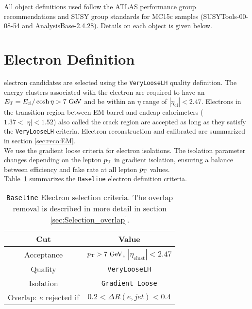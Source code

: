 \indent All object definitions used follow the ATLAS performance group recommendations and SUSY group standards for MC15c samples ({\sc SUSYTools-00-08-54} and {\sc AnalysisBase-2.4.28}).  Details on each object is given below. \\

\section{Electron Definition}  \label{sec:EleDef}

 electron candidates are selected using the {\tt VeryLooseLH} quality definition. The energy clusters associated with the electron are required to have an $\et = E_{\mathrm{cl}} / \cosh{\eta} > 7 \gev$ and be within an $\eta$ range of $|\eta_{\mathrm{cl}}| < 2.47$. Electrons in the transition region between EM barrel and endcap calorimeters ($1.37 < |\eta| < 1.52$) also called the crack region are accepted as long as they satisfy the {\tt VeryLooseLH} criteria. Electron reconstruction and calibrated are summarized in section \ref{sec:reco:EM}.\\

\indent We use the gradient loose criteria for electron isolations. The isolation parameter changes depending on the lepton $p_{\mathrm{T}}$ in gradient isolation, ensuring a balance between efficiency and fake rate at all lepton $p_{\mathrm{T}}$ values. \\

\indent Table~\ref{tb:electrons:baseline} summarizes the {\tt Baseline} electron definition criteria.   


\begin{table}[htp]
  \begin{center}
    \begin{tabular}{c|c} \hline \hline
      Cut & Value \\ \hline \hline
      Acceptance & $\pT > 7 \gev$, $|\eta_{\mathrm{clust}}| < 2.47$ \\ \hline
      Quality & {\tt VeryLooseLH} \\ \hline
      Isolation & {\tt Gradient Loose} \\ \hline
      Overlap: $e$ rejected if &  $0.2 < \Delta R(e,jet) < 0.4$\\ \hline%
      \hline
    \end{tabular}
  \caption{{\tt Baseline} Electron selection criteria. The overlap removal is described in more detail in section \ref{sec:Selection_overlap}.}
  \end{center}
  \label{tb:electrons:baseline}
\end{table}%

